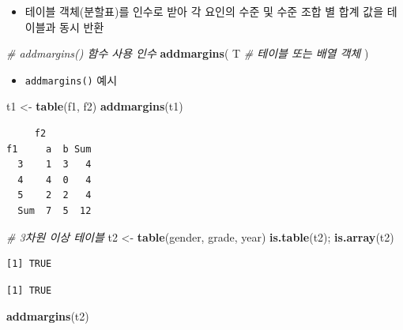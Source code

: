 \documentclass[
  11pt,
]{krantz}
\newenvironment{Shaded}{\begin{snugshade}}{\end{snugshade}}
\newcommand{\CommentTok}[1]{\textcolor[rgb]{0.37,0.37,0.37}{\textit{#1}}}
\newcommand{\KeywordTok}[1]{\textcolor[rgb]{0.27,0.27,0.27}{\textbf{#1}}}
\newcommand{\NormalTok}[1]{#1}
\newcommand{\StringTok}[1]{\textcolor[rgb]{0.5,0.5,0.5}{#1}}
\providecommand{\tightlist}{%
  \setlength{\itemsep}{0pt}\setlength{\parskip}{0pt}}
\begin{document}
\begin{itemize}
\tightlist
\item
  테이블 객체(분할표)를 인수로 받아 각 요인의 수준 및 수준 조합 별 합계 값을 테이블과 동시 반환
\end{itemize}

\footnotesize

\begin{Shaded}
\begin{Highlighting}[]
\CommentTok{# addmargins() 함수 사용 인수}
\KeywordTok{addmargins}\NormalTok{(}
\NormalTok{  T }\CommentTok{# 테이블 또는 배열 객체 }
\NormalTok{)}
\end{Highlighting}
\end{Shaded}

\normalsize

\begin{itemize}
\tightlist
\item
  \texttt{addmargins()} 예시
\end{itemize}

\footnotesize

\begin{Shaded}
\begin{Highlighting}[]
\NormalTok{t1 <-}\StringTok{ }\KeywordTok{table}\NormalTok{(f1, f2)}
\KeywordTok{addmargins}\NormalTok{(t1)}
\end{Highlighting}
\end{Shaded}

\begin{verbatim}
     f2
f1     a  b Sum
  3    1  3   4
  4    4  0   4
  5    2  2   4
  Sum  7  5  12
\end{verbatim}

\begin{Shaded}
\begin{Highlighting}[]
\CommentTok{# 3차원 이상 테이블}
\NormalTok{t2 <-}\StringTok{ }\KeywordTok{table}\NormalTok{(gender, grade, year)}
\KeywordTok{is.table}\NormalTok{(t2); }\KeywordTok{is.array}\NormalTok{(t2)}
\end{Highlighting}
\end{Shaded}

\begin{verbatim}
[1] TRUE
\end{verbatim}

\begin{verbatim}
[1] TRUE
\end{verbatim}

\begin{Shaded}
\begin{Highlighting}[]
\KeywordTok{addmargins}\NormalTok{(t2)}
\end{Highlighting}
\end{Shaded}
\end{document}
